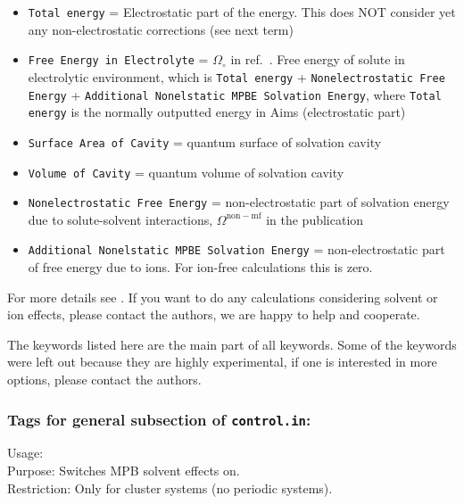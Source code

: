 \begin{itemize}
\item \texttt{Total energy} = Electrostatic part of the energy. This does NOT consider yet any non-electrostatic corrections (see next term)
\item \texttt{Free Energy in Electrolyte} = $\Omega_\circ$ in ref.~\cite{Ringe2016}. Free energy of solute in electrolytic environment, which is \texttt{Total energy} + \texttt{Nonelectrostatic Free Energy} + \texttt{Additional Nonelstatic MPBE Solvation Energy}, where \texttt{Total energy} is the normally outputted energy in Aims (electrostatic part)
\item \texttt{Surface Area of Cavity} = quantum surface of solvation cavity
\item \texttt{Volume of Cavity} = quantum volume of solvation cavity
\item \texttt{Nonelectrostatic Free Energy} = non-electrostatic part of solvation energy due to solute-solvent interactions, $\Omega^\mathrm{non-mf}$ in the publication
\item \texttt{Additional Nonelstatic MPBE Solvation Energy} = non-electrostatic part of free energy due to ions. For ion-free calculations this is zero.
\end{itemize}

For more details see \cite{Ringe2016,Ringe2017}. If you want to do any calculations considering solvent or ion effects, please contact the authors, we are happy to help and cooperate. 

The keywords listed here are the main part of all keywords. Some of the keywords were left out because they are highly experimental, if one is interested in more options, please contact the authors.

\newpage

\subsubsection*{Tags for general subsection of \texttt{control.in}:}

{
  \noindent
  Usage: \\[1.0ex]
  Purpose: Switches MPB solvent effects on.\\[1.0ex]
  Restriction: Only for cluster systems (no periodic systems). \\ 
}

